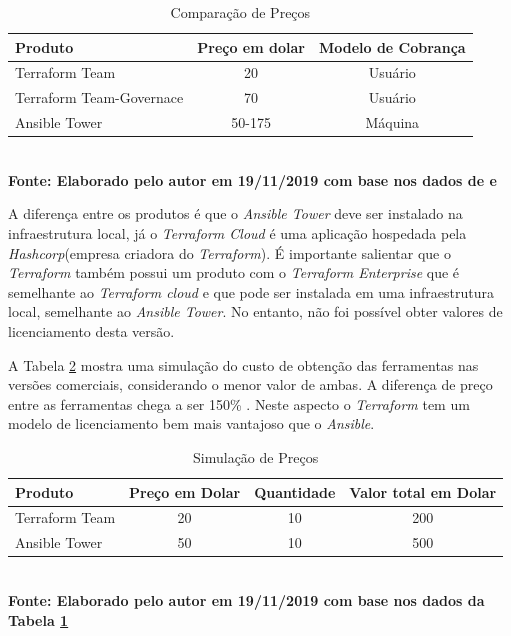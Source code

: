    \begin{table}[H]
	\centering
	\caption{\hspace{0.1cm} Comparação de Preços}
	\vspace{-0.3cm} %
	\label{tab:tabela4}
	\begin{tabular}{l|c|c}
  \hline
    \textbf{Produto}	& \textbf{Preço em dolar} & \textbf{Modelo de Cobrança} \\
    \hline
  Terraform Team & 20  & Usuário\\
  Terraform Team-Governace  & 70 &   Usuário  \\
  Ansible Tower  & 50-175 &   Máquina  \\
     \hline
 \end{tabular}
 	\vspace{.1cm}  %
	\small
	{\footnotesize\\ \textbf{Fonte: Elaborado pelo autor em 19/11/2019 com base nos dados de \textit{\cite{opensource.io}} e  \textit{\cite{hashcorp3}}}}
\end{table}

A diferença entre os produtos é que o \textit{Ansible Tower} deve ser instalado na infraestrutura local, já o \textit{Terraform Cloud} é uma aplicação hospedada pela \textit{Hashcorp}(empresa criadora do \textit{Terraform}). É importante salientar que o \textit{Terraform} também possui um produto com o \textit{Terraform Enterprise} que é semelhante ao \textit{Terraform cloud} e  que pode ser instalada em uma infraestrutura local, semelhante ao \textit{Ansible Tower}. No entanto, não foi possível obter valores de licenciamento desta versão.  


A Tabela \ref{tab:tabela5} mostra uma simulação  do custo de obtenção das ferramentas nas versões comerciais, considerando o menor valor de ambas. A diferença de preço entre as ferramentas chega a ser 150\% . Neste aspecto o \textit{Terraform} tem um modelo de licenciamento bem mais vantajoso que o \textit{Ansible}.  


   \begin{table}[H]
	\centering
	\caption{\hspace{0.1cm} Simulação de Preços}
	\vspace{-0.3cm} %
	\label{tab:tabela5}
	\begin{tabular}{l|c|c|c}
  \hline
    \textbf{Produto} & \textbf{Preço em Dolar} & \textbf{Quantidade}  & \textbf{Valor total em Dolar} \\
    \hline
  Terraform Team & 20  & 10 & 200\\
  Ansible Tower  & 50 & 10 & 500\\
     \hline
 \end{tabular}
 	\vspace{.1cm}  %
	\small
	{\footnotesize\\ \textbf{Fonte: Elaborado pelo autor em 19/11/2019 com base nos dados da Tabela \ref{tab:tabela4}}}
\end{table}



